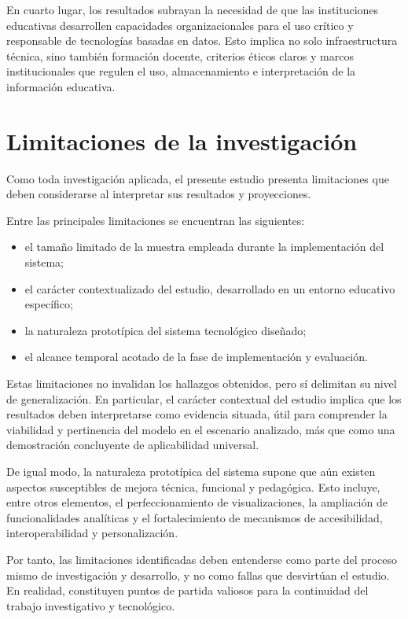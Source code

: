 \begin{refsection}
En cuarto lugar, los resultados subrayan la necesidad de que las instituciones educativas desarrollen capacidades organizacionales para el uso crítico y responsable de tecnologías basadas en datos. Esto implica no solo infraestructura técnica, sino también formación docente, criterios éticos claros y marcos institucionales que regulen el uso, almacenamiento e interpretación de la información educativa.

\section{Limitaciones de la investigación}

Como toda investigación aplicada, el presente estudio presenta limitaciones que deben considerarse al interpretar sus resultados y proyecciones.

Entre las principales limitaciones se encuentran las siguientes:

\begin{itemize}
\item el tamaño limitado de la muestra empleada durante la implementación del sistema;
\item el carácter contextualizado del estudio, desarrollado en un entorno educativo específico;
\item la naturaleza prototípica del sistema tecnológico diseñado;
\item el alcance temporal acotado de la fase de implementación y evaluación.
\end{itemize}

Estas limitaciones no invalidan los hallazgos obtenidos, pero sí delimitan su nivel de generalización. En particular, el carácter contextual del estudio implica que los resultados deben interpretarse como evidencia situada, útil para comprender la viabilidad y pertinencia del modelo en el escenario analizado, más que como una demostración concluyente de aplicabilidad universal.

De igual modo, la naturaleza prototípica del sistema supone que aún existen aspectos susceptibles de mejora técnica, funcional y pedagógica. Esto incluye, entre otros elementos, el perfeccionamiento de visualizaciones, la ampliación de funcionalidades analíticas y el fortalecimiento de mecanismos de accesibilidad, interoperabilidad y personalización.

Por tanto, las limitaciones identificadas deben entenderse como parte del proceso mismo de investigación y desarrollo, y no como fallas que desvirtúan el estudio. En realidad, constituyen puntos de partida valiosos para la continuidad del trabajo investigativo y tecnológico.


\end{refsection}
